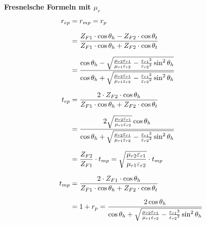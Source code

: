 \textbf{Fresnelsche Formeln mit $\mu_r$}
\begin{equation*}
	\setlength{\jot}{10pt}
	\begin{aligned}
		r_{ep}    & =  r_{mp} = r_{p} 
		\\
		& = \frac{Z_{F1} \cdot \cos \theta_h-Z_{F2} \cdot \cos \theta_t}{Z_{F1} \cdot \cos \theta_h+Z_{F2} \cdot \cos \theta_t}
		\\
		& =\frac{\cos \theta_h-\sqrt{\frac{\mu_{r 2} \varepsilon_{r 1}}{\mu_{r 1} \varepsilon_{r 2}}-\frac{\varepsilon_{r 1}{ }^2}{\varepsilon_{r 2}{ }^2} \sin ^2 \theta_h}}{\cos \theta_h+\sqrt{\frac{\mu_{r 2} \varepsilon_{r 1}}{\mu_{r 1} \varepsilon_{r 2}}-\frac{\varepsilon_{r 1}{ }^2}{\varepsilon_{r 2}{} ^2} \sin ^2 \theta_h}} 
        \\
		t_{ep} & =  \frac{2 \cdot Z_{F2}   \cdot  \cos \theta_h}{Z_{F1} \cdot \cos \theta_h+Z_{F2} \cdot \cos \theta_t}
        \\                                                                                                                                                                                                                                                                                         
        &=\frac{2 \sqrt{\frac{\mu_{r 2} \varepsilon_{r 1}}{\mu_{r 1} \varepsilon_{r 2}}} \cos \theta_h}{\cos \theta_h+\sqrt{\frac{\mu_{r 2} \varepsilon_{r 1}}{\mu_{r 1} \varepsilon_{r 2}}-\frac{\varepsilon_{r 1}{ }^2}{\varepsilon_{r 2}{ }^2} \sin ^2 \theta_h}} 
        \\
		& = \frac{Z_{F2}}{Z_{F1}}\cdot t_{mp} = \sqrt{\frac{\mu_{r2}\varepsilon_{r1}}{\mu_{r1}\varepsilon_{r2}}}\cdot t_{mp} 
		\\
		t_{mp} & = \frac{2 \cdot  Z_{F1}\cdot \cos \theta_h}{Z_{F1} \cdot \cos \theta_h+Z_{F2} \cdot \cos \theta_t}                    
        \\
		& = 1+r_p =\frac{2 \cos \theta_h}{\cos \theta_h+\sqrt{\frac{\mu_{r 2} \varepsilon_{r 1}}{\mu_{r 1} \varepsilon_{r 2}}-\frac{\varepsilon_{r 1}{ }^2}{\varepsilon_{r 2}{ }^2} \sin ^2 \theta_h}}  		
	\end{aligned}
\end{equation*}